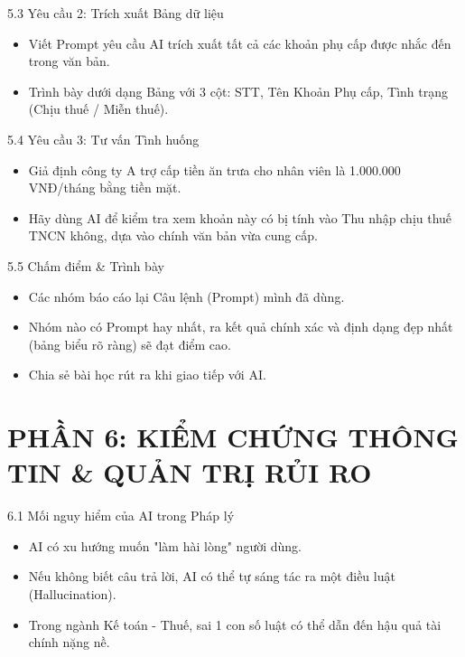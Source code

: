 \documentclass[aspectratio=169]{beamer}
\begin{document}
\begin{frame}{5.3 Yêu cầu 2: Trích xuất Bảng dữ liệu}
    \begin{itemize}
        \item Viết Prompt yêu cầu AI trích xuất tất cả các khoản phụ cấp được nhắc đến trong văn bản.
        \item Trình bày dưới dạng Bảng với 3 cột: STT, Tên Khoản Phụ cấp, Tình trạng (Chịu thuế / Miễn thuế).
    \end{itemize}
\end{frame}


\begin{frame}{5.4 Yêu cầu 3: Tư vấn Tình huống}
    \begin{itemize}
        \item Giả định công ty A trợ cấp tiền ăn trưa cho nhân viên là 1.000.000 VNĐ/tháng bằng tiền mặt.
        \item Hãy dùng AI để kiểm tra xem khoản này có bị tính vào Thu nhập chịu thuế TNCN không, dựa vào chính văn bản vừa cung cấp.
    \end{itemize}
\end{frame}


\begin{frame}{5.5 Chấm điểm \& Trình bày}
    \begin{itemize}
        \item Các nhóm báo cáo lại Câu lệnh (Prompt) mình đã dùng.
        \item Nhóm nào có Prompt hay nhất, ra kết quả chính xác và định dạng đẹp nhất (bảng biểu rõ ràng) sẽ đạt điểm cao.
        \item Chia sẻ bài học rút ra khi giao tiếp với AI.
    \end{itemize}
\end{frame}


\section{PHẦN 6: KIỂM CHỨNG THÔNG TIN \& QUẢN TRỊ RỦI RO}


\begin{frame}{6.1 Mối nguy hiểm của AI trong Pháp lý}
    \begin{itemize}
        \item AI có xu hướng muốn "làm hài lòng" người dùng.
        \item Nếu không biết câu trả lời, AI có thể tự sáng tác ra một điều luật (Hallucination).
        \item Trong ngành Kế toán - Thuế, sai 1 con số luật có thể dẫn đến hậu quả tài chính nặng nề.
    \end{itemize}
\end{frame}
\end{document}
